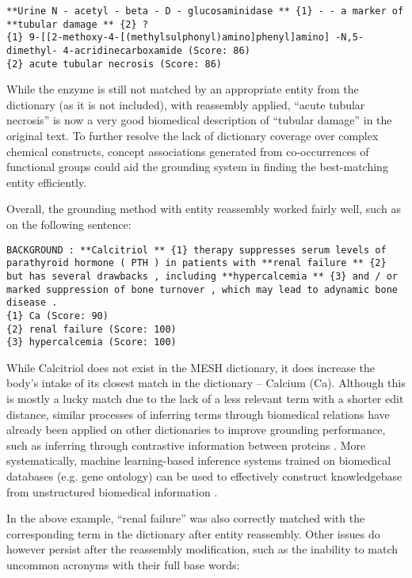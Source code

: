 \documentclass[10pt, oneside]{article}
\begin{document}
\begin{lstlisting}[breaklines]
**Urine N - acetyl - beta - D - glucosaminidase ** {1} - - a marker of **tubular damage ** {2} ? 
{1} 9-[[2-methoxy-4-[(methylsulphonyl)amino]phenyl]amino] -N,5-dimethyl- 4-acridinecarboxamide (Score: 86)
{2} acute tubular necrosis (Score: 86)
\end{lstlisting}

While the enzyme is still not matched by an appropriate entity from the dictionary (as it is not included), with reassembly applied, ``acute tubular necrosis'' is now a very good biomedical description of ``tubular damage'' in the original text. To further resolve the lack of dictionary coverage over complex chemical constructs, concept associations generated from co-occurrences of functional groups \cite{tsuruoka2008facta} could aid the grounding system in finding the best-matching entity efficiently.

Overall, the grounding method with entity reassembly worked fairly well, such as on the following sentence:

\begin{lstlisting}[breaklines]
BACKGROUND : **Calcitriol ** {1} therapy suppresses serum levels of parathyroid hormone ( PTH ) in patients with **renal failure ** {2} but has several drawbacks , including **hypercalcemia ** {3} and / or marked suppression of bone turnover , which may lead to adynamic bone disease . 
{1} Ca (Score: 90)
{2} renal failure (Score: 100)
{3} hypercalcemia (Score: 100)
\end{lstlisting}

While Calcitriol does not exist in the MESH dictionary, it does increase the body's intake of its closest match in the dictionary -- Calcium (Ca). Although this is mostly a lucky match due to the lack of a less relevant term with a shorter edit distance, similar processes of inferring terms through biomedical relations have already been applied on other dictionaries to improve grounding performance, such as inferring through contrastive information between proteins \cite{kim2005biocontrasts}. More systematically, machine learning-based inference systems trained on biomedical databases (e.g. gene ontology) can be used to effectively construct knowledgebase from unstructured biomedical information \cite{shin2015incremental}. 

In the above example, ``renal failure'' was also correctly matched with the corresponding term in the dictionary after entity reassembly. Other issues do however persist after the reassembly modification, such as the inability to match uncommon acronyms with their full base words:
\end{document}
